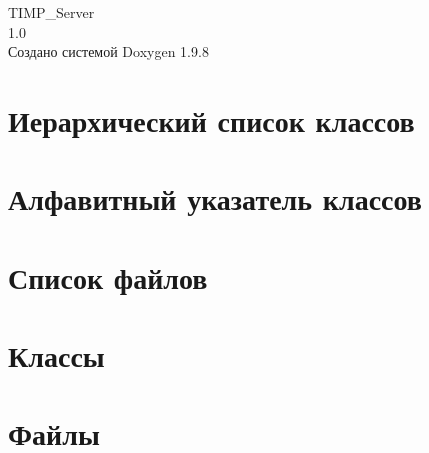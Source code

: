 \documentclass[twoside]{book}
\newcommand{\+}{\discretionary{\mbox{\scriptsize$\hookleftarrow$}}{}{}}
\newcommand{\clearemptydoublepage}{%
    \newpage{\pagestyle{empty}\cleardoublepage}%
  }
\begin{document}
  \raggedbottom
    \hypersetup{pageanchor=false,
                bookmarksnumbered=true,
                pdfencoding=unicode
               }
  \begin{titlepage}
  \vspace*{7cm}
  \begin{center}%
  {\Large TIMP\+\_\+\+Server}\\
  [1ex]\large 1.\+0 \\
  \vspace*{1cm}
  {\large Создано системой Doxygen 1.9.8}\\
  \end{center}
  \end{titlepage}
  \clearemptydoublepage
  \tableofcontents
  \clearemptydoublepage
  \hypersetup{pageanchor=true}
\chapter{Иерархический список классов}

\chapter{Алфавитный указатель классов}

\chapter{Список файлов}

\chapter{Классы}












\chapter{Файлы}






















  \backmatter
  \newpage
  \clearemptydoublepage
  \printindex
\end{document}
